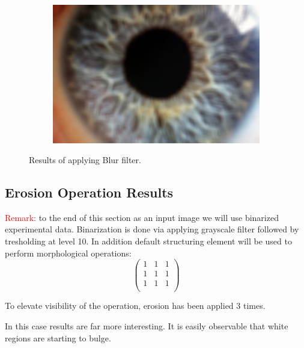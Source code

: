 \documentclass{article}
\begin{document}
\begin{figure}[H]
\begin{subfigure}{.09\textwidth}
\end{subfigure}%
\begin{subfigure}{.47\textwidth}
  \centering
  \includegraphics[width=0.97\linewidth]{_Figures/raw_data_4_blur.png}
  \caption{}
  \label{fig:raw_4_blur}
\end{subfigure}

\caption{Results of applying Blur filter. }
\label{fig:blur_results}
\end{figure}

%
%
\newpage
\subsection{Erosion Operation Results} \label{erosion_results}
\textcolor{red}{Remark:} to the end of this section as an input image we will use binarized experimental data. Binarization is done via applying grayscale filter followed by tresholding at level 10. In addition default structuring element will be used to perform morphological operations:
\[
\begin{pmatrix}
  1 & 1 & 1 \\
  1 & 1 & 1 \\
  1 & 1 & 1  \\
 \end{pmatrix}
 \]
 
To elevate visibility of the operation, erosion has been applied 3 times.

In this case results are far more interesting. It is easily observable that white regions are starting to bulge.
\end{document}
